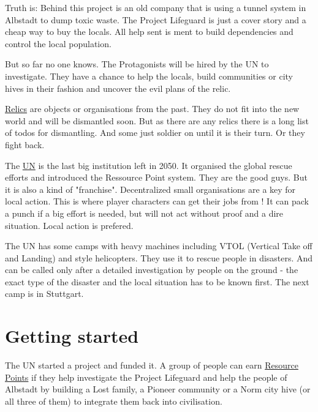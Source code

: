 Truth is: Behind this project is an old company that is using a tunnel system in Albstadt to dump toxic waste. The Project Lifeguard is just a  cover story and a cheap way to buy the locals. All help sent is ment to build dependencies and control the local population.

But so far no one knows. The Protagonists will be hired by the UN to investigate. They have a chance to help the locals, build communities or city hives in their fashion and uncover the evil plans of the relic.

\begin{sidebarBox}[title=Relics]
\hyperref[sec: Relic]{Relics} are objects or organisations from the past. They do not fit into the new world and will be dismantled soon. But as there are any relics there is a long list of todos for dismantling. And some just soldier on until it is their turn. Or they fight back.
\end{sidebarBox}

\begin{sidebarBox}[title=UN]
The \hyperref[sec: UN]{UN} is the last big institution left in 2050. It organised the global rescue efforts and introduced the Ressource Point system. They are the good guys.
But it is also a kind of "franchise". Decentralized small organisations are a key for local action. This is where player characters can get their jobs from !
It can pack a punch if a big effort is needed, but will not act without proof and a dire situation.
Local action is prefered.

The UN has some camps with heavy machines including VTOL (Vertical Take off and Landing) and style helicopters. They use it to rescue people in disasters. And can be called only after a detailed investigation by people on the ground - the exact type of the disaster and the local situation has to be known first. The next camp is in Stuttgart.
\end{sidebarBox}

\section{Getting started}

The UN started a project and funded it. A group of people can earn \hyperref[sec:Resource Points]{Resource Points} if they help investigate the Project Lifeguard and help the people of Albstadt by building a Lost family, a Pioneer community or a Norm city hive (or all three of them) to integrate them back into civilisation.

